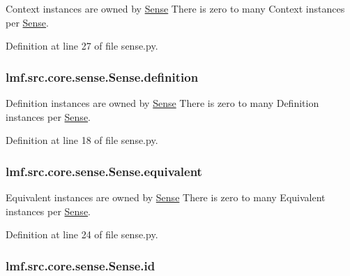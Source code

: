Context instances are owned by \hyperlink{classlmf_1_1src_1_1core_1_1sense_1_1_sense}{Sense} There is zero to many Context instances per \hyperlink{classlmf_1_1src_1_1core_1_1sense_1_1_sense}{Sense}. 



Definition at line 27 of file sense.\+py.

\hypertarget{classlmf_1_1src_1_1core_1_1sense_1_1_sense_a9adfd8936ecd6626cba82193e068e09e}{
\subsubsection[{definition}]{\setlength{\rightskip}{0pt plus 5cm}lmf.\+src.\+core.\+sense.\+Sense.\+definition}}\label{classlmf_1_1src_1_1core_1_1sense_1_1_sense_a9adfd8936ecd6626cba82193e068e09e}


Definition instances are owned by \hyperlink{classlmf_1_1src_1_1core_1_1sense_1_1_sense}{Sense} There is zero to many Definition instances per \hyperlink{classlmf_1_1src_1_1core_1_1sense_1_1_sense}{Sense}. 



Definition at line 18 of file sense.\+py.

\hypertarget{classlmf_1_1src_1_1core_1_1sense_1_1_sense_a94d3b05f734fbe8898902ae948d30ce5}{
\subsubsection[{equivalent}]{\setlength{\rightskip}{0pt plus 5cm}lmf.\+src.\+core.\+sense.\+Sense.\+equivalent}}\label{classlmf_1_1src_1_1core_1_1sense_1_1_sense_a94d3b05f734fbe8898902ae948d30ce5}


Equivalent instances are owned by \hyperlink{classlmf_1_1src_1_1core_1_1sense_1_1_sense}{Sense} There is zero to many Equivalent instances per \hyperlink{classlmf_1_1src_1_1core_1_1sense_1_1_sense}{Sense}. 



Definition at line 24 of file sense.\+py.

\hypertarget{classlmf_1_1src_1_1core_1_1sense_1_1_sense_ae0febecc9ab2951c5c6bb82f675187bc}{
\subsubsection[{id}]{\setlength{\rightskip}{0pt plus 5cm}lmf.\+src.\+core.\+sense.\+Sense.\+id}}\label{classlmf_1_1src_1_1core_1_1sense_1_1_sense_ae0febecc9ab2951c5c6bb82f675187bc}


